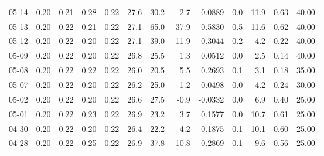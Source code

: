 \begin{threeparttable}
{\begin{tabular}{lrrrrrrrrrrrr}
  05-14 &          0.20 &          0.21 &          0.28 &        0.22 &                27.6 &                30.2 &       -2.7 &      -0.0889 &                 0.0 &             11.9 &            0.63 &                  40.00 \\
  05-13 &          0.20 &          0.22 &          0.21 &        0.22 &                27.1 &                65.0 &      -37.9 &      -0.5830 &                 0.5 &             11.6 &            0.62 &                  40.00 \\
  05-12 &          0.20 &          0.22 &          0.20 &        0.22 &                27.1 &                39.0 &      -11.9 &      -0.3044 &                 0.2 &              4.2 &            0.22 &                  40.00 \\
  05-09 &          0.20 &          0.22 &          0.20 &        0.22 &                26.8 &                25.5 &        1.3 &       0.0512 &                 0.0 &              2.5 &            0.14 &                  40.00 \\
  05-08 &          0.20 &          0.22 &          0.22 &        0.22 &                26.0 &                20.5 &        5.5 &       0.2693 &                 0.1 &              3.1 &            0.18 &                  35.00 \\
  05-07 &          0.20 &          0.22 &          0.20 &        0.22 &                26.2 &                25.0 &        1.2 &       0.0498 &                 0.0 &              4.2 &            0.24 &                  30.00 \\
  05-02 &          0.20 &          0.22 &          0.20 &        0.22 &                26.6 &                27.5 &       -0.9 &      -0.0332 &                 0.0 &              6.9 &            0.40 &                  25.00 \\
  05-01 &          0.20 &          0.22 &          0.23 &        0.22 &                26.9 &                23.2 &        3.7 &       0.1577 &                 0.0 &             10.7 &            0.61 &                  25.00 \\
  04-30 &          0.20 &          0.22 &          0.20 &        0.22 &                26.4 &                22.2 &        4.2 &       0.1875 &                 0.1 &             10.1 &            0.60 &                  25.00 \\
  04-28 &          0.20 &          0.22 &          0.25 &        0.22 &                26.9 &                37.8 &      -10.8 &      -0.2869 &                 0.1 &              9.6 &            0.56 &                  25.00 \\

\end{tabular}}
\end{threeparttable}
